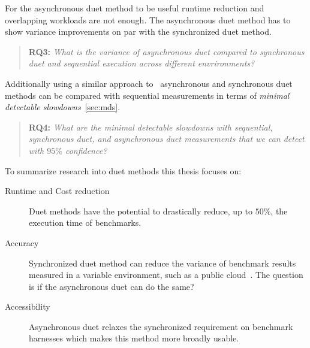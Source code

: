 For the asynchronous duet method to be useful runtime reduction and overlapping workloads are not enough.
The asynchronous duet method has to show variance improvements on par with the synchronized duet method.

\begin{quote}
	\textbf{RQ3:} \emph{What is the variance of asynchronous duet compared to synchronous duet and sequential execution across different envrironments?}
\end{quote}

Additionally using a similar approach to~\citet{laaber2019software} asynchronous and synchronous duet methods can be compared with sequential measurements in terms of \emph{minimal detectable slowdowns}~\cref{sec:mds}.

\begin{quote}
	\textbf{RQ4:} \emph{What are the minimal detectable slowdowns with sequential, synchronous duet, and asynchronous duet measurements that we can detect with $95\%$ confidence?}
\end{quote}

To summarize research into duet methods this thesis focuses on:
\begin{description}
	\item[Runtime and Cost reduction] Duet methods have the potential to drastically reduce, up to $50\%$, the execution time of benchmarks.
	\item[Accuracy] Synchronized duet method can reduce the variance of benchmark results measured in a variable environment, such as a public cloud~\citet{bulej2020duet}. The question is if the asynchronous duet can do the same?
	\item[Accessibility] Asynchronous duet relaxes the synchronized requirement on benchmark harnesses which makes this method more broadly usable.
\end{description}
